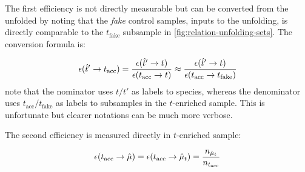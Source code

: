 The first efficiency  is not directly measurable
but can be converted from the unfolded 
by noting that the \emph{fake} \muon control samples,
inputs to the unfolding,
is directly comparable to the $t_\text{fake}$ subsample
in \cref{fig:relation-unfolding-sets}.
The conversion formula is:

\begin{equation}
    \misEff[\hat{t}']{t_\text{acc}} =
    \frac{
        \misEff[\hat{t}']{t}
    }{
        \misEff[t_\text{acc}]{t}
    } \approx
    \frac{
        \misEff[\hat{t}']{t}
    }{
        \misEff[t_\text{acc}]{t_\text{fake}}
    }
\end{equation}
note that the nominator uses $t/t'$ as labels to species, whereas the
denominator uses $t_\text{acc}/t_\text{fake}$ as labels to subsamples
in the $t$-enriched \pidcalib sample.
This is unfortunate but clearer notations can be much more verbose.

The second efficiency  is measured directly
in $t$-enriched \pidcalib sample:

\begin{equation}
    \misEff[t_\text{acc}]{\hat{\mu}} =
        \misEff[t_\text{acc}]{\hat{\mu}_t} =
        \frac{n_{\hat{\mu}_t}}{n_{t_\text{acc}}}
\end{equation}
